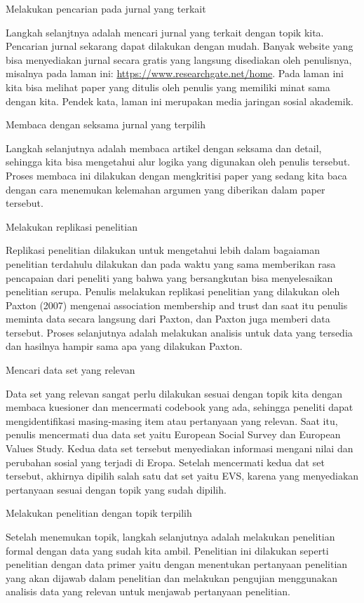 \documentclass[
]{book}
\begin{document}
Melakukan pencarian pada jurnal yang terkait

Langkah selanjtnya adalah mencari jurnal yang terkait dengan topik kita. Pencarian jurnal sekarang dapat dilakukan dengan mudah. Banyak website yang bisa menyediakan jurnal secara gratis yang langsung disediakan oleh penulisnya, misalnya pada laman ini: \url{https://www.researchgate.net/home}. Pada laman ini kita bisa melihat paper yang ditulis oleh penulis yang memiliki minat sama dengan kita. Pendek kata, laman ini merupakan media jaringan sosial akademik.

Membaca dengan seksama jurnal yang terpilih

Langkah selanjutnya adalah membaca artikel dengan seksama dan detail, sehingga kita bisa mengetahui alur logika yang digunakan oleh penulis tersebut. Proses membaca ini dilakukan dengan mengkritisi paper yang sedang kita baca dengan cara menemukan kelemahan argumen yang diberikan dalam paper tersebut.

Melakukan replikasi penelitian

Replikasi penelitian dilakukan untuk mengetahui lebih dalam bagaiaman penelitian terdahulu dilakukan dan pada waktu yang sama memberikan rasa pencapaian dari peneliti yang bahwa yang bersangkutan bisa menyelesaikan penelitian serupa. Penulis melakukan replikasi penelitian yang dilakukan oleh Paxton (2007) mengenai association membership and trust dan saat itu penulis meminta data secara langsung dari Paxton, dan Paxton juga memberi data tersebut. Proses selanjutnya adalah melakukan analisis untuk data yang tersedia dan hasilnya hampir sama apa yang dilakukan Paxton.

Mencari data set yang relevan

Data set yang relevan sangat perlu dilakukan sesuai dengan topik kita dengan membaca kuesioner dan mencermati codebook yang ada, sehingga peneliti dapat mengidentifikasi masing-masing item atau pertanyaan yang relevan. Saat itu, penulis mencermati dua data set yaitu European Social Survey dan European Values Study. Kedua data set tersebut menyediakan informasi mengani nilai dan perubahan sosial yang terjadi di Eropa. Setelah mencermati kedua dat set tersebut, akhirnya dipilih salah satu dat set yaitu EVS, karena yang menyediakan pertanyaan sesuai dengan topik yang sudah dipilih.

Melakukan penelitian dengan topik terpilih

Setelah menemukan topik, langkah selanjutnya adalah melakukan penelitian formal dengan data yang sudah kita ambil. Penelitian ini dilakukan seperti penelitian dengan data primer yaitu dengan menentukan pertanyaan penelitian yang akan dijawab dalam penelitian dan melakukan pengujian menggunakan analisis data yang relevan untuk menjawab pertanyaan penelitian.
\end{document}
